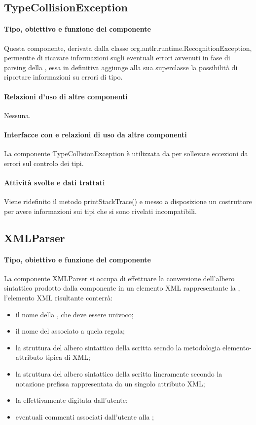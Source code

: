 \documentclass[11pt,titlepage,a4paper]{report}
\begin{document}
\subsection{TypeCollisionException}
\paragraph{Tipo, obiettivo e funzione del componente}
Questa componente, derivata dalla classe org.antlr.runtime.RecognitionException, permentte di ricavare informazioni sugli eventuali errori avvenuti in fase di parsing della \br, essa in definitiva aggiunge alla sua superclasse la possibilit\`a di riportare informazioni su errori di tipo.
\paragraph{Relazioni d'uso di altre componenti}
Nessuna.
\paragraph{Interfacce con e relazioni di uso da altre componenti}
La componente TypeCollisionException \`e utilizzata da \brp per sollevare eccezioni da errori sul controlo dei tipi.
\paragraph{Attivit\`a svolte e dati trattati}
Viene ridefinito il metodo printStackTrace() e messo a disposizione un costruttore per avere informazioni sui tipi che si sono rivelati incompatibili.

\subsection{XMLParser}%
\paragraph{Tipo, obiettivo e funzione del componente}
La componente XMLParser si occupa di effettuare la conversione dell'albero sintattico prodotto dalla componente \brp in un elemento XML rappresentante la \br, l'elemento XML risultante conterr\`a:
\begin{itemize}
 \item il nome della \br, che deve essere univoco;
 \item il nome del \bo associato a quela regola;
 \item la struttura del albero sintattico della \br scritta secndo la metodologia elemento-attributo tipica di XML;
 \item la struttura del albero sintattico della \br scritta lineramente secondo la notazione prefissa rappresentata da un singolo attributo XML;
 \item la \br effettivamente digitata dall'utente;
 \item eventuali commenti associati dall'utente alla \br;
\end{itemize}
\end{document}
